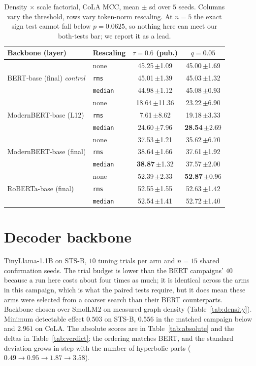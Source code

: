 \documentclass{article}
\begin{document}
\begin{table}[h]
\caption{Density $\times$ scale factorial, CoLA MCC, mean $\pm$ sd over $5$
seeds. Columns vary the threshold, rows vary token-norm rescaling. At $n=5$ the
exact sign test cannot fall below $p=0.0625$, so nothing here can meet our
both-tests bar; we report it as a lead.}
\label{tab:fix}
\begin{center}
\small
\begin{tabular}{llcc}
\toprule
Backbone (layer) & Rescaling & $\tau=0.6$ (pub.) & $q=0.05$ \\
\midrule
\multirow{3}{*}{BERT-base (final) \emph{control}}
  & none            & 45.25\,$\pm$1.09 & 45.00\,$\pm$1.69 \\
  & \texttt{rms}    & 45.01\,$\pm$1.39 & 45.03\,$\pm$1.32 \\
  & \texttt{median} & 44.98\,$\pm$1.12 & 45.08\,$\pm$0.93 \\
\midrule
\multirow{3}{*}{ModernBERT-base (L12)}
  & none            & 18.64\,$\pm$11.36 & 23.22\,$\pm$6.90 \\
  & \texttt{rms}    & \phantom{0}7.61\,$\pm$8.62 & 19.18\,$\pm$3.33 \\
  & \texttt{median} & 24.60\,$\pm$7.96 & \textbf{28.54}\,$\pm$2.69 \\
\midrule
\multirow{3}{*}{ModernBERT-base (final)}
  & none            & 37.53\,$\pm$1.21 & 35.62\,$\pm$6.70 \\
  & \texttt{rms}    & 38.64\,$\pm$1.66 & 37.61\,$\pm$1.92 \\
  & \texttt{median} & \textbf{38.87}\,$\pm$1.32 & 37.57\,$\pm$2.00 \\
\midrule
\multirow{3}{*}{RoBERTa-base (final)}
  & none            & 52.39\,$\pm$2.33 & \textbf{52.87}\,$\pm$0.96 \\
  & \texttt{rms}    & 52.55\,$\pm$1.55 & 52.63\,$\pm$1.42 \\
  & \texttt{median} & 52.54\,$\pm$1.41 & 52.72\,$\pm$1.40 \\
\bottomrule
\end{tabular}
\end{center}
\end{table}

\section{Decoder backbone}
\label{app:decoder}

TinyLlama-1.1B on STS-B, $10$ tuning trials per arm and $n=15$ shared
confirmation seeds. The trial budget is lower than the BERT campaigns' $40$
because a run here costs about four times as much; it is identical across the
arms in this campaign, which is what the paired tests require, but it does mean
these arms were selected from a coarser search than their BERT counterparts.
Backbone chosen over SmolLM2 on measured graph density
(Table~\ref{tab:density}). Minimum detectable effect $0.503$ on STS-B, $0.556$
in the matched campaign below and $2.961$ on CoLA. The absolute
scores are in Table~\ref{tab:absolute} and the deltas in
Table~\ref{tab:verdict}; the ordering matches BERT, and the standard deviation
grows in step with the number of hyperbolic parts
($0.49 \rightarrow 0.95 \rightarrow 1.87 \rightarrow 3.58$).
\end{document}
